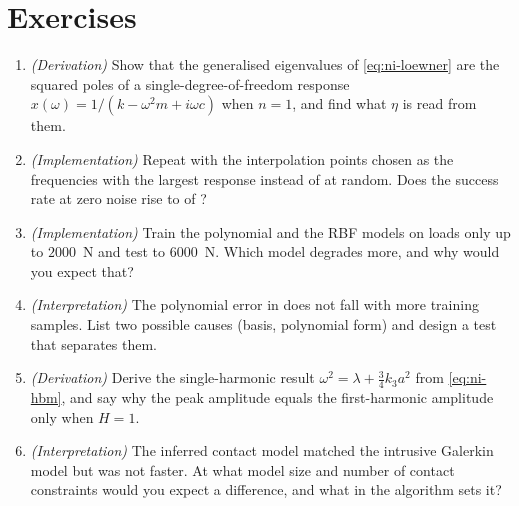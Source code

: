 \section*{Exercises}\label{sec:ni-exercises}
\begin{enumerate}
\item \emph{(Derivation)} Show that the generalised eigenvalues of \eqref{eq:ni-loewner} are the squared poles of a single-degree-of-freedom response $x(\omega)=1/(k-\omega^2m+i\omega c)$ when $n=1$, and find what $\eta$ is read from them.
\item \emph{(Implementation)} Repeat  with the interpolation points chosen as the frequencies with the largest response instead of at random. Does the success rate at zero noise rise to \cldNDraw{} of \cldNDraw{}?
\item \emph{(Implementation)} Train the polynomial and the RBF models on loads only up to $2000$~N and test to $6000$~N. Which model degrades more, and why would you expect that?
\item \emph{(Interpretation)} The polynomial error in  does not fall with more training samples. List two possible causes (basis, polynomial form) and design a test that separates them.
\item \emph{(Derivation)} Derive the single-harmonic result $\omega^2=\lambda+\tfrac34k_3a^2$ from \eqref{eq:ni-hbm}, and say why the peak amplitude equals the first-harmonic amplitude only when $H=1$.
\item \emph{(Interpretation)} The inferred contact model matched the intrusive Galerkin model but was not faster. At what model size and number of contact constraints would you expect a difference, and what in the algorithm sets it?
\end{enumerate}

\chapterrefs
